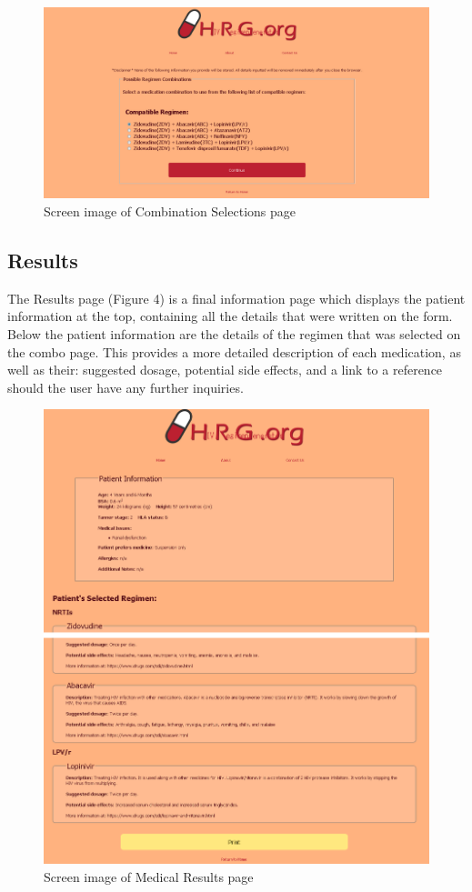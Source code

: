 \documentclass[12pt]{article}
\begin{document}
\begin{figure}[H]
  \centering
  \includegraphics[width=\linewidth]{combo.png}
  \caption{Screen image of Combination Selections page}
  \label{fig:combo}
\end{figure}

\subsection{Results}
The Results page (Figure 4) is a final information page which displays the patient information at the top, containing all the details that were written on the form. Below the patient information are the details of the regimen that was selected on the combo page. This provides a more detailed description of each medication, as well as their: suggested dosage, potential side effects, and a link to a reference should the user have any further inquiries.

\begin{figure}[H]
  \centering
  \includegraphics[width=\linewidth]{results1.png}
  \caption{Screen image of Medical Results page}
  \label{fig:results1}
\end{figure}
\end{document}
